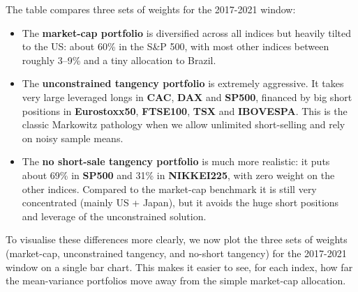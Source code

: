 \documentclass[11pt]{article}
\begin{document}
    The table compares three sets of weights for the 2017-2021 window:

\begin{itemize}
\item
  The \textbf{market-cap portfolio} is diversified across all indices
  but heavily tilted to the US: about 60\% in the S\&P 500, with most
  other indices between roughly 3--9\% and a tiny allocation to Brazil.
\item
  The \textbf{unconstrained tangency portfolio} is extremely aggressive.
  It takes very large leveraged longs in \textbf{CAC}, \textbf{DAX} and
  \textbf{SP500}, financed by big short positions in
  \textbf{Eurostoxx50}, \textbf{FTSE100}, \textbf{TSX} and
  \textbf{IBOVESPA}. This is the classic Markowitz pathology when we
  allow unlimited short-selling and rely on noisy sample means.
\item
  The \textbf{no short-sale tangency portfolio} is much more realistic:
  it puts about 69\% in \textbf{SP500} and 31\% in \textbf{NIKKEI225},
  with zero weight on the other indices. Compared to the market-cap
  benchmark it is still very concentrated (mainly US + Japan), but it
  avoids the huge short positions and leverage of the unconstrained
  solution.
\end{itemize}

    To visualise these differences more clearly, we now plot the three sets
of weights (market-cap, unconstrained tangency, and no-short tangency)
for the 2017-2021 window on a single bar chart. This makes it easier to
see, for each index, how far the mean-variance portfolios move away from
the simple market-cap allocation.
\end{document}
